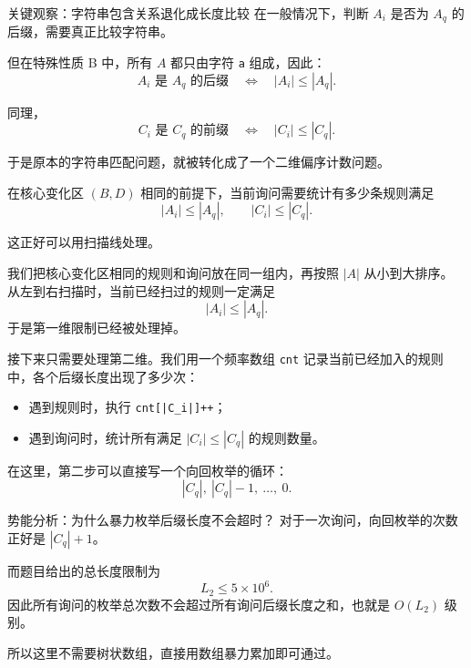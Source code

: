 \documentclass{book}
\newcommand{\code}[1]{\colorbox{codebg}{\texttt{#1}}}  %
\begin{document}
\begin{keybox}{关键观察：字符串包含关系退化成长度比较}
在一般情况下，判断 $A_i$ 是否为 $A_q$ 的后缀，需要真正比较字符串。

但在特殊性质 B 中，所有 $A$ 都只由字符 \code{a} 组成，因此：
\[
A_i \text{ 是 } A_q \text{ 的后缀}
\quad\Longleftrightarrow\quad
|A_i|\le |A_q|.
\]

同理，
\[
C_i \text{ 是 } C_q \text{ 的前缀}
\quad\Longleftrightarrow\quad
|C_i|\le |C_q|.
\]

于是原本的字符串匹配问题，就被转化成了一个二维偏序计数问题。
\end{keybox}

在核心变化区 $(B,D)$ 相同的前提下，当前询问需要统计有多少条规则满足
\[
|A_i|\le |A_q|,\qquad |C_i|\le |C_q|.
\]

这正好可以用扫描线处理。

我们把核心变化区相同的规则和询问放在同一组内，再按照 $|A|$ 从小到大排序。  
从左到右扫描时，当前已经扫过的规则一定满足
\[
|A_i|\le |A_q|.
\]
于是第一维限制已经被处理掉。

接下来只需要处理第二维。我们用一个频率数组 \code{cnt} 记录当前已经加入的规则中，各个后缀长度出现了多少次：

\begin{itemize}[leftmargin=2em,itemsep=1pt,topsep=2pt,parsep=0pt,partopsep=0pt]
    \item 遇到规则时，执行 \code{cnt[|C\_i|]++}；
    \item 遇到询问时，统计所有满足 $|C_i|\le |C_q|$ 的规则数量。
\end{itemize}

在这里，第二步可以直接写一个向回枚举的循环：
\[
|C_q|,\ |C_q|-1,\ \ldots,\ 0.
\]

\begin{keybox}{势能分析：为什么暴力枚举后缀长度不会超时？}
对于一次询问，向回枚举的次数正好是 $|C_q|+1$。

而题目给出的总长度限制为
\[
L_2\le 5\times 10^6.
\]
因此所有询问的枚举总次数不会超过所有询问后缀长度之和，也就是 $O(L_2)$ 级别。

所以这里不需要树状数组，直接用数组暴力累加即可通过。
\end{keybox}
\end{document}
